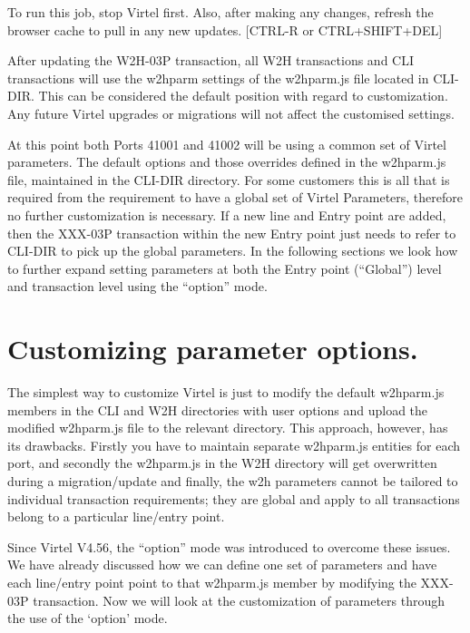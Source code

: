 \documentclass[letterpaper,10pt,english]{sphinxmanual}
\begin{document}
To run this job, stop Virtel first. Also, after making any changes, refresh the browser cache to pull in any new updates. {[}CTRL-R or CTRL+SHIFT+DEL{]}

After updating the W2H-03P transaction, all W2H transactions and CLI transactions will use the w2hparm settings of the w2hparm.js file located in CLI-DIR. This can be considered the default position with regard to customization. Any future Virtel upgrades or migrations will not affect the customised settings.

At this point both Ports 41001 and 41002 will be using a common set of Virtel parameters. The default options and those overrides defined in the w2hparm.js file, maintained in the CLI-DIR directory. For some customers this is all that is required from the requirement to have a global set of Virtel Parameters, therefore no further customization is necessary. If a new line and Entry point are added, then the XXX-03P transaction within the new Entry point just needs to refer to CLI-DIR to pick up the global parameters. In the following sections we look how to further expand setting parameters at both the Entry point (“Global”) level and transaction level using the “option” mode.


\section{Customizing parameter options.}
\label{\detokenize{TN202002:customizing-parameter-options}}
The simplest way to customize Virtel is just to modify the default w2hparm.js members in the CLI and W2H directories with user options and upload the modified w2hparm.js file to the relevant directory. This approach, however, has its drawbacks. Firstly you have to maintain separate w2hparm.js entities for each port, and secondly the w2hparm.js in the W2H directory will get overwritten during a migration/update and finally, the w2h parameters cannot be tailored to individual transaction requirements; they are global and apply to all transactions belong to a particular line/entry point.

Since Virtel V4.56, the “option” mode was introduced to overcome these issues. We have already discussed how we can define one set of parameters and have each line/entry point point to that w2hparm.js member by modifying the XXX-03P transaction. Now we will look at the customization of parameters through the use of the ‘option’ mode.
\end{document}
